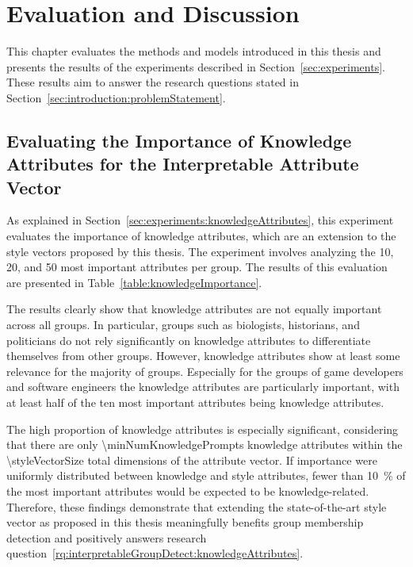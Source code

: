 \chapter{Evaluation and Discussion}%
\label{sec:evaluation}

This chapter evaluates the methods and models introduced in this thesis and presents the results of the experiments described in Section~\ref{sec:experiments}. These results aim to answer the research questions stated in Section~\ref{sec:introduction:problemStatement}.

\section{Evaluating the Importance of Knowledge Attributes for the Interpretable Attribute Vector}%
\label{sec:evaluation:knowledgeAttributes}

As explained in Section~\ref{sec:experiments:knowledgeAttributes}, this experiment evaluates the importance of knowledge attributes, which are an extension to the style vectors proposed by this thesis. The experiment involves analyzing the \num{10}, \num{20}, and \num{50} most important attributes per group. The results of this evaluation are presented in Table~\ref{table:knowledgeImportance}.

The results clearly show that knowledge attributes are not equally important across all groups. In particular, groups such as biologists, historians, and politicians do not rely significantly on knowledge attributes to differentiate themselves from other groups. However, knowledge attributes show at least some relevance for the majority of groups. Especially for the groups of game developers and software engineers the knowledge attributes are particularly important, with at least half of the ten most important attributes being knowledge attributes.

The high proportion of knowledge attributes is especially significant, considering that there are only \num{\minNumKnowledgePrompts} knowledge attributes within the \num{\styleVectorSize} total dimensions of the attribute vector. If importance were uniformly distributed between knowledge and style attributes, fewer than \SI{10}{\percent} of the most important attributes would be expected to be knowledge-related. Therefore, these findings demonstrate that extending the state-of-the-art style vector as proposed in this thesis meaningfully benefits group membership detection and positively answers research question~\ref{rq:interpretableGroupDetect:knowledgeAttributes}.


